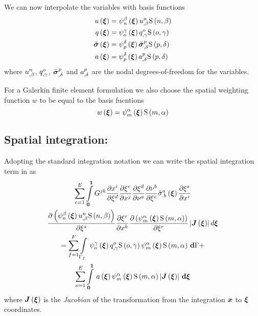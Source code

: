 We can now interpolate the variables with basis functions \ie
\begin{equation}
  \begin{split}
     u\left( \boldsymbol{\xi} \right)  &=
       \psi_{n}^{\beta} \left( \boldsymbol{\xi} \right)    {u}^{n} _{,\beta}    \mathrm{S} \left( n,\beta \right)   \\
     q\left( \boldsymbol{\xi} \right)  &= 
       \psi_{o}^{\gamma} \left( \boldsymbol{\xi} \right)    {q}^{o} _{,\gamma}    \mathrm{S} \left( o,\gamma \right)   \\
     \tilde{\boldsymbol{\mathit{\sigma}}}\left( \boldsymbol{\xi} \right)  &=
       \psi_{p}^{\delta} \left( \boldsymbol{\xi} \right)    {\tilde{\boldsymbol{\mathit{\sigma}}}}^{p} _{,\delta}    \mathrm{S} \left( p,\delta \right)   \\
     a\left( \boldsymbol{\xi} \right)  &=
       \psi_{p}^{\delta} \left( \boldsymbol{\xi} \right)    {a}^{p} _{,\delta}    \mathrm{S} \left( p,\delta \right)  
  \end{split}
\end{equation}
where $  {u}^{n} _{,\beta} $, $  {q}^{o} _{,\gamma} $, 
$  {\tilde{\boldsymbol{\mathit{\sigma}}}}^{p} _{,\delta} $ and $  {a}^{p} _{,\delta} $ are the
nodal degrees-of-freedom for the variables.

For a Galerkin finite element formulation we also choose the spatial weighting
function $w$ to be equal to the basis fucntions \ie
\begin{equation}
   w\left( \boldsymbol{\xi} \right) =   \psi_{m}^{\alpha} \left( \boldsymbol{\xi} \right)     \mathrm{S} \left( m,\alpha \right)  
\end{equation}

\subsection{Spatial integration:}

Adopting the standard integration notation we can write the spatial
integration term in  as
\begin{multline}
  \dsum_{e=1}^{E}\dintl{\vectr{0}}{\vectr{1}}G^{jk}\delby{x^{i}}{\xi^{d}}
    \delby{\xi^{e}}{x^{j}}\delby{\xi^{d}}{\nu^{a}}
    \delby{\nu^{b}}{\xi^{e}}\fnof{{\tilde{\sigma}}^{a}_{.b}}{\vectr{\xi}}\delby{\xi^{s}}{x^{i}} \\
    \delby{\pbrac{\gbfn{n}{\beta}{\vectr{\xi}}\nodedof{u}{n}{\beta}\gsf{n}{\beta}}}{\xi^{s}}
    \delby{\xi^{r}}{x^{k}}\delby{\pbrac{\gbfn{m}{\alpha}{\vectr{\xi}}\gsf{m}{\alpha}}}{\xi^{r}}
    \abs{\fnof{\matr{J}}{\vectr{\xi}}}d\vectr{\xi} \\ 
  = \dsum_{f=1}^{F}\gint{\Gamma_{f}}{}{\gbfn{o}{\gamma}{\vectr{\xi}}\nodedof{q}{o}{\gamma}
    \gsf{o}{\gamma}\gbfn{m}{\alpha}{\vectr{\xi}}\gsf{m}{\alpha}}{\Gamma} + \\
  \dsum_{e=1}^{E}\gint{\vectr{0}}{\vectr{1}}{\fnof{a}{\vectr{\xi}}\gbfn{m}{\alpha}{\vectr{\xi}}
    \gsf{m}{\alpha}\abs{\fnof{\matr{J}}{\vectr{\xi}}}}{\vectr{\xi}}
\end{multline}
where $\fnof{\matr{J}}{\vectr{\xi}}$ is the \emph{Jacobian} of the
transformation from the integration $\boldsymbol{x}$ to $\boldsymbol{\xi}$ coordinates.

